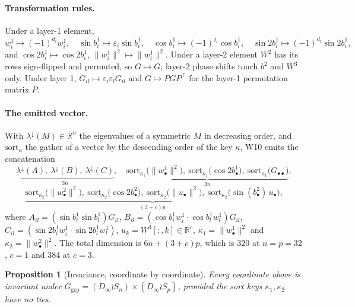 \documentclass[10pt,twocolumn,letterpaper]{article}
\newtheorem{proposition}[theorem]{Proposition}
\theoremstyle{definition}
\newcommand{\R}{\mathbb{R}}
\newcommand{\Dinf}{D_\infty}
\begin{document}
\paragraph{Transformation rules.} Under a layer-1 element,
\[
w^1_i \mapsto (-1)^{d_i} w^1_i, \quad
\sin b^1_i \mapsto \varepsilon_i \sin b^1_i, \quad
\cos b^1_i \mapsto (-1)^{j_i}\cos b^1_i, \quad
\sin 2b^1_i \mapsto (-1)^{d_i}\sin 2b^1_i,
\]
and $\cos 2b^1_i \mapsto \cos 2b^1_i$, $\|w^1_i\|^2 \mapsto \|w^1_i\|^2$. Under a layer-2 element
$W^2$ has its rows sign-flipped and permuted, so $G \mapsto G$; layer-2 phase shifts touch $b^2$
and $W^3$ only. Under layer 1, $G_{il} \mapsto \varepsilon_i\varepsilon_l G_{il}$ and
$G \mapsto PGP^\top$ for the layer-1 permutation matrix $P$.

\paragraph{The emitted vector.} With $\lambda^{\downarrow}(M) \in \R^n$ the eigenvalues of a
symmetric $M$ in decreasing order, and $\mathrm{sort}_{\kappa}$ the gather of a vector by the
descending order of the key $\kappa$, W10 emits the concatenation
\[
\underbrace{\lambda^{\downarrow}(A),\ \lambda^{\downarrow}(B),\ \lambda^{\downarrow}(C)}_{3n},\quad
\underbrace{\mathrm{sort}_{\kappa_1}\big(\|w^1_\bullet\|^2\big),\
\mathrm{sort}_{\kappa_1}\big(\cos 2b^1_\bullet\big),\
\mathrm{sort}_{\kappa_1}\big(G_{\bullet\bullet}\big)}_{3n},
\]
\[
\underbrace{\mathrm{sort}_{\kappa_2}\big(\|w^2_\bullet\|^2\big),\
\mathrm{sort}_{\kappa_2}\big(\cos 2b^2_\bullet\big),\
\mathrm{sort}_{\kappa_2}\big(\|u_\bullet\|^2\big),\
\mathrm{sort}_{\kappa_2}\big(\sin(b^2_\bullet)\,u_\bullet\big)}_{(3+c)p},
\]
where $A_{il} = (\sin b^1_i \sin b^1_l)G_{il}$,
$B_{il} = (\cos b^1_i w^1_i \cdot \cos b^1_l w^1_l)G_{il}$,
$C_{il} = (\sin 2b^1_i w^1_i \cdot \sin 2b^1_l w^1_l)$, $u_k = W^3[:,k] \in \R^c$,
$\kappa_1 = \|w^1_\bullet\|^2$ and $\kappa_2 = \|w^2_\bullet\|^2$. The total dimension is
$6n + (3+c)p$, which is $320$ at $n=p=32$, $c=1$ and $384$ at $c=3$.

\begin{proposition}[Invariance, coordinate by coordinate]
Every coordinate above is invariant under $G_{\mathrm{grp}} = (\Dinf \wr S_n)\times(\Dinf \wr S_p)$,
provided the sort keys $\kappa_1,\kappa_2$ have no ties.
\end{proposition}
\end{document}
